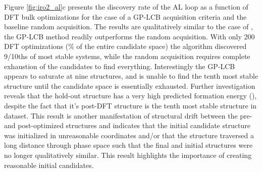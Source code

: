 %
Figure \ref{fig:iro2_al}c presents the discovery rate of the AL loop as a function of DFT bulk optimizations for the case of a GP-LCB acquisition criteria and the baseline random acquisition.
%
The results are qualitatively similar to the case of \IrOthree,
the GP-LCB method readily outperforms the random acquisition.
%
With only \num{200} DFT optimizations (\% of the entire candidate space) the algorithm discovered \num{9/10}ths of most stable systems,
while the random acquisition requires complete exhaustion of the candidates to find everything.
%
Interestingly the GP-LCB appears to saturate at nine structures, and is unable to find the tenth most stable structure until the candidate space is essentially exhausted.
%
Further investigation reveals that the hold-out structure has a very high predicted formation energy (\DHf),
despite the fact that it's post-DFT structure is the tenth most stable structure in dataset.
%
This result is another manifestation of structural drift between the pre- and post-optimized structures and indicates that the initial candidate structure was initialized in unreasonable coordinates and/or that the structure traversed a long distance through phase space such that the final and initial structures were no longer qualitatively similar.
%
This result highlights the importance of creating reasonable initial candidates.



